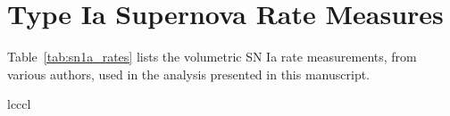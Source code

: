 \documentclass[apj, twocolumn]{aastex62}
\begin{document}
{}

\appendix

\section {Type Ia Supernova Rate Measures}\label{sec:ratemeas}
Table~\ref{tab:sn1a_rates} lists the volumetric SN Ia rate measurements, from various authors, used in the analysis presented in this manuscript.

\startlongtable
\begin{deluxetable}{lcccl}
\label{tab:sn1a_rates}


\end{deluxetable}
\end{document}
